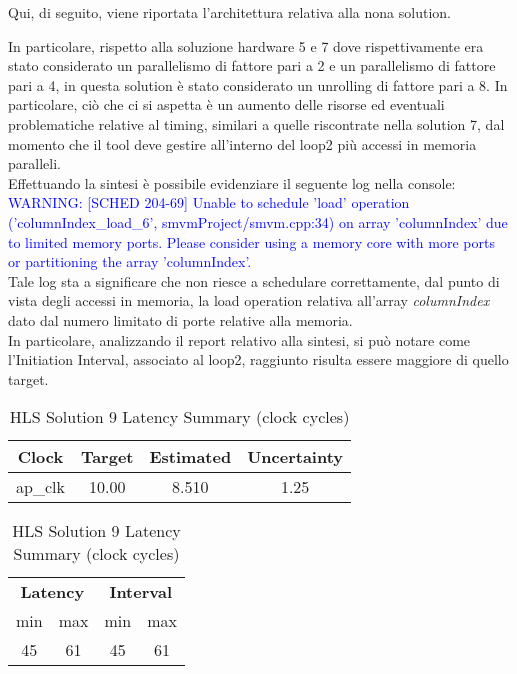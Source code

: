 Qui, di seguito, viene riportata l'architettura relativa alla nona solution.



In particolare, rispetto alla soluzione hardware 5 e 7 dove rispettivamente era stato considerato un parallelismo di fattore pari a 2 e un parallelismo di fattore pari a 4, in questa solution è stato considerato un unrolling di fattore pari a 8. In particolare, ciò che ci si aspetta è un aumento delle risorse ed eventuali problematiche relative al timing, similari a quelle riscontrate nella solution 7, dal momento che il tool deve gestire all'interno del loop2 più accessi in memoria paralleli.
\\
Effettuando la sintesi è possibile evidenziare il seguente log nella console:
\\
\textcolor{blue}{WARNING: [SCHED 204-69] Unable to schedule 'load' operation ('columnIndex\_load\_6', smvmProject/smvm.cpp:34) on array 'columnIndex' due to limited memory ports. Please consider using a memory core with more ports or partitioning the array 'columnIndex'.}
\\
Tale log sta a significare che non riesce a schedulare correttamente, dal punto di vista degli accessi in memoria, la load operation relativa all'array \textit{columnIndex} dato dal numero limitato di porte relative alla memoria.
\\
In particolare, analizzando il report relativo alla sintesi, si può notare come l'Initiation Interval, associato al loop2, raggiunto risulta essere maggiore di quello target.
\\

\begin{table}[H]
	\centering
	\begin{minipage}[t]{0.45\linewidth}
		\centering
		\begin{tabular}{|c|c|c|c|}
			\hline
			\textbf{Clock} & \textbf{Target} & \textbf{Estimated} & \textbf{Uncertainty} \\
			\hline
			ap\_clk & 10.00 & 8.510 & 1.25 \\
			\hline
		\end{tabular}
		\caption{HLS Solution 9 Timing Summary (ns)}
		\label{tab:hls-solution-9-timing-summary}
	\end{minipage}
	\hfill
	\begin{minipage}[t]{0.45\linewidth}
		\centering
		\begin{tabular}{|c|c|c|c|}
			\hline
			\multicolumn{2}{|c|}{\textbf{Latency}} & \multicolumn{2}{|c|}{\textbf{Interval}} \\
			min & max & min & max \\
			\hline
			45 & 61 & 45 & 61 \\
			\hline
		\end{tabular}
		\caption{HLS Solution 9 Latency Summary (clock cycles)}
		\label{tab:hls-solution-9-latency-summary}
	\end{minipage}
\end{table}

